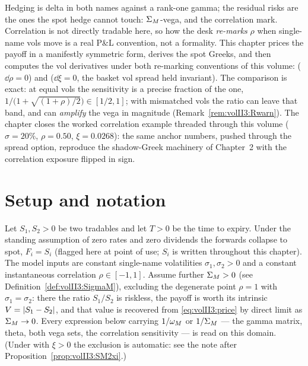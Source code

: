 Hedging is delta in both names against a rank-one gamma; the residual risks are
the ones the spot hedge cannot touch: $\Sigma_M$-vega, and the correlation mark.
Correlation is not directly tradable here, so how the desk \emph{re-marks}
$\rho$ when single-name vols move is a real P\&L convention, not a formality.
This chapter prices the payoff in a manifestly symmetric form, derives the spot
Greeks, and then computes the vol derivatives under both re-marking
conventions of this volume: \stickyrho{} ($\dd\rho = 0$) and \stickycvc{}
($\dd\xi = 0$, the basket vol spread held invariant). The comparison is exact:
at equal vols the \stickycvc{} sensitivity is a precise fraction of the
\stickyrho{} one, $1\big/\bigl(1 + \sqrt{(1+\rho)/2}\bigr) \in [1/2, 1]$;
with mismatched vols the ratio can leave that band, and \stickycvc{} can
\emph{amplify} the vega in magnitude
(Remark~\ref{rem:volII3:Rwarn}).
The chapter closes the worked correlation example threaded through this volume
($\sigma = 20\%$, $\rho = 0.50$, $\xi = 0.0268$): the same anchor numbers,
pushed through the spread option, reproduce the shadow-Greek machinery of
Chapter~2 with the correlation exposure flipped in sign.

\section{Setup and notation}
\label{sec:volII3:setup}

\begin{assumption}\label{ass:volII3:margrabe}
Let $S_1, S_2 > 0$ be two tradables and let $T > 0$ be the time to expiry.
Under the standing assumption of zero rates and zero dividends the forwards
collapse to spot, $F_i = S_i$ (flagged here at point of use; $S_i$ is
written throughout this chapter). The model inputs are constant single-name
volatilities $\sigma_1, \sigma_2 > 0$ and a constant instantaneous correlation
$\rho \in [-1, 1]$. Assume further $\Sigma_M > 0$ (see
Definition~\ref{def:volII3:SigmaM}), excluding the degenerate point
$\rho = 1$ with $\sigma_1 = \sigma_2$: there the ratio $S_1/S_2$ is riskless,
the payoff is worth its intrinsic $V = \lvert S_1 - S_2\rvert$, and that value is
recovered from \eqref{eq:volII3:price} by direct limit as $\Sigma_M \to 0$.
Every expression below carrying $1/\omega_M$ or $1/\Sigma_M$ --- the gamma matrix,
theta, both vega sets, the correlation sensitivity --- is read on this domain.
(Under \stickycvc{} with $\xi > 0$ the exclusion is automatic:
see the note after Proposition~\ref{prop:volII3:SM2xi}.)
\end{assumption}


